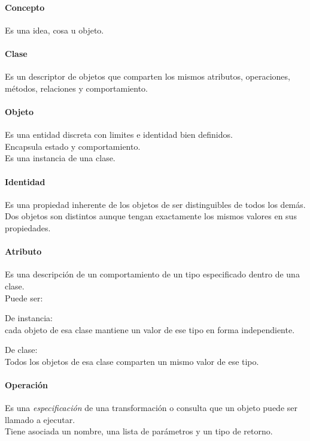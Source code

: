 \documentclass[a4paper,12pt,oneside]{report}
\begin{document}
        \paragraph{Concepto}
          Es una idea, cosa u objeto.

        \paragraph{Clase}
          Es un descriptor de objetos que comparten los mismos atributos,
          operaciones, m\'etodos, relaciones y comportamiento.

        \paragraph{Objeto}
          Es una entidad discreta con limites e identidad bien definidos.\\
          Encapsula estado y comportamiento.\\
          Es una instancia de una clase.

        \paragraph{Identidad}
          Es una propiedad inherente de los objetos de ser distinguibles de
          todos los dem\'as.\\
          Dos objetos son distintos aunque tengan exactamente los mismos
          valores en sus propiedades.

        \paragraph{Atributo}
          Es una descripci\'on de un comportamiento de un tipo especificado
          dentro de una clase.\\
          Puede ser:
            \begin{description}
              \item De instancia:\\
                      cada objeto de esa clase mantiene un valor de ese tipo en
                      forma independiente.
              \item De clase:\\
                      Todos los objetos de esa clase comparten un mismo valor de
                      ese tipo.
            \end{description}

        \paragraph{Operaci\'on}
          Es una \emph{especificaci\'on} de una transformaci\'on o consulta
          que un objeto puede ser llamado a ejecutar.\\
          Tiene asociada un nombre, una lista de par\'ametros y un tipo de
          retorno.
\end{document}
